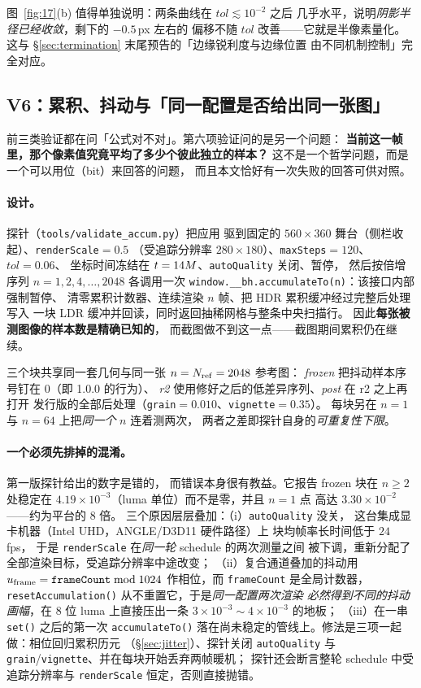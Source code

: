 图~\ref{fig:17}(b) 值得单独说明：两条曲线在 $tol\lesssim10^{-2}$ 之后
几乎水平，说明\emph{阴影半径已经收敛}，剩下的 $-0.5$\,px 左右的
偏移不随 $tol$ 改善——它就是半像素量化。
这与 \S\ref{sec:termination} 末尾预告的「边缘锐利度与边缘位置
由不同机制控制」完全对应。

\subsection{V6：累积、抖动与「同一配置是否给出同一张图」}\label{sec:v6}

前三类验证都在问「公式对不对」。第六项验证问的是另一个问题：
\textbf{当前这一帧里，那个像素值究竟平均了多少个彼此独立的样本？}
这不是一个哲学问题，而是一个可以用位（bit）来回答的问题，
而且本文恰好有一次失败的回答可供对照。

\paragraph{设计。}探针（\texttt{tools/validate\_accum.py}）把应用
驱到固定的 $560\times360$ 舞台（侧栏收起）、\texttt{renderScale}$=0.5$
（受追踪分辨率 $280\times180$）、\texttt{maxSteps}$=120$、$tol=0.06$、
坐标时间冻结在 $t=14M$、\texttt{autoQuality} 关闭、暂停，
然后按倍增序列 $n=1,2,4,\dots,2048$ 各调用一次
\texttt{window.\_\_bh.accumulateTo(n)}：该接口内部强制暂停、
清零累积计数器、连续渲染 $n$ 帧、把 HDR 累积缓冲经过完整后处理写入
一块 LDR 缓冲并回读，同时返回抽稀网格与整条中央扫描行。
因此\textbf{每张被测图像的样本数是精确已知的}，
而截图做不到这一点——截图期间累积仍在继续。

三个块共享同一套几何与同一张 $n=N_{\rm ref}=2048$ 参考图：
\emph{frozen} 把抖动样本序号钉在 0（即 1.0.0 的行为）、
\emph{r2} 使用修好之后的低差异序列、\emph{post} 在 r2 之上再打开
发行版的全部后处理（\texttt{grain}$=0.010$、\texttt{vignette}$=0.35$）。
每块另在 $n=1$ 与 $n=64$ 上把\emph{同一个} $n$ 连着测两次，
两者之差即探针自身的\emph{可重复性下限}。

\paragraph{一个必须先排掉的混淆。}第一版探针给出的数字是错的，
而错误本身很有教益。它报告 frozen 块在 $n\ge2$ 处稳定在
$4.19\times10^{-3}$（luma 单位）而不是零，并且 $n=1$ 点
高达 $3.30\times10^{-2}$——约为平台的 8 倍。
三个原因层层叠加：（i）\texttt{autoQuality} 没关，
这台集成显卡机器（Intel UHD，ANGLE/D3D11 硬件路径）上
块均帧率长时间低于 $24$\,fps，
于是 \texttt{renderScale} 在\emph{同一轮} schedule 的两次测量之间
被下调，重新分配了全部渲染目标，受追踪分辨率中途改变；
（ii）复合通道叠加的抖动用 $u_{\rm frame}=\texttt{frameCount}\bmod1024$
作相位，而 \texttt{frameCount} 是全局计数器，
\texttt{resetAccumulation()} 从不重置它，于是\emph{同一配置两次渲染
必然得到不同的抖动画幅}，在 8 位 luma 上直接压出一条
$3\times10^{-3}\sim4\times10^{-3}$ 的地板；
（iii）在一串 \texttt{set()} 之后的第一次 \texttt{accumulateTo()}
落在尚未稳定的管线上。修法是三项一起做：相位回归累积历元
（\S\ref{sec:jitter}）、探针关闭 \texttt{autoQuality} 与
\texttt{grain}/\texttt{vignette}、并在每块开始丢弃两帧暖机；
探针还会断言整轮 schedule 中受追踪分辨率与 \texttt{renderScale}
恒定，否则直接抛错。

